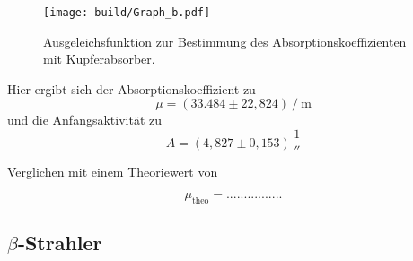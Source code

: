   \begin{figure}[H]
      \centering
      \texttt{[image: build/Graph\_b.pdf]}
      \caption{Ausgeleichsfunktion zur Bestimmung des Absorptionskoeffizienten mit Kupferabsorber.}
      \label{fig:plot2}
  \end{figure}

Hier ergibt sich der Absorptionskoeffizient zu
\begin{equation*}
    \mu =  \left(33.484 \pm 22,824\right) \mathbin{/} \unit{\meter}
\end{equation*}
und die Anfangsaktivität zu
\begin{equation*}
    A = (4,827 \pm 0,153) \, \unit{\frac{1}{\second}}
\end{equation*}

Verglichen mit einem Theoriewert von %

\begin{equation*}
    \mu_{\text{theo}} = ................
\end{equation*}

\subsection*{$\beta$-Strahler}

